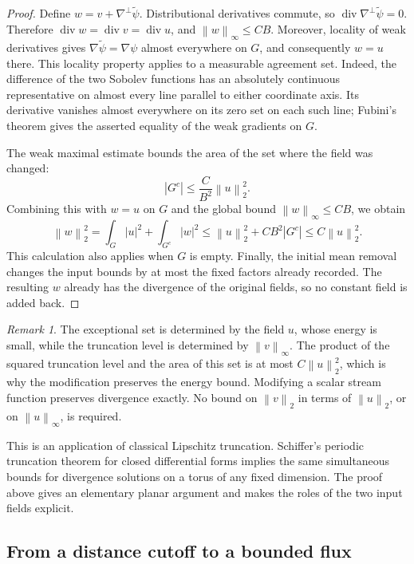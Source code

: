 \documentclass[11pt]{article}
\newcommand{\diver}{\operatorname{div}}
\newcommand{\norm}[1]{\left\lVert #1\right\rVert}
\theoremstyle{remark}
\newtheorem{remark}[theorem]{Remark}
\numberwithin{equation}{section}
\begin{document}
\begin{proof}
Define \(w=v+\nabla^\perp\widetilde\psi\). Distributional derivatives
commute, so \(\diver\nabla^\perp\widetilde\psi=0\). Therefore
\(\diver w=\diver v=\diver u\), and
\(\norm w_\infty\le CB\).
Moreover, locality of weak derivatives gives
\(\nabla\widetilde\psi=\nabla\psi\) almost everywhere on \(G\),
and consequently \(w=u\) there. This locality property applies to a
measurable agreement set. Indeed, the difference of the two Sobolev
functions has an absolutely continuous representative on almost every
line parallel to either coordinate axis. Its derivative vanishes almost
everywhere on its zero set on each such line; Fubini's theorem gives
the asserted equality of the weak gradients on \(G\).

The weak maximal estimate bounds the area of the set where the field
was changed:
\[
 |G^c|\le \frac{C}{B^2}\norm u_2^2.
\]
Combining this with \(w=u\) on \(G\) and the global bound
\(\norm w_\infty\le CB\), we obtain
\[
 \norm w_2^2
 =\int_G|u|^2+\int_{G^c}|w|^2
 \le\norm u_2^2+CB^2|G^c|
 \le C\norm u_2^2.
\]
This calculation also applies when \(G\) is empty. Finally, the
initial mean removal changes the input bounds by at most the fixed
factors already recorded. The resulting \(w\) already has the
divergence of the original fields, so no constant field is added back.
\end{proof}

\begin{remark}
The exceptional set is determined by the field \(u\), whose energy is
small, while the truncation level is determined by \(\norm v_\infty\).
The product of the squared truncation level and the area of this set is
at most \(C\norm u_2^2\), which is why the modification preserves the
energy bound. Modifying a scalar stream function preserves divergence
exactly. No bound on \(\norm v_2\) in terms of \(\norm u_2\), or on
\(\norm u_\infty\), is required.

This is an application of classical Lipschitz truncation.
Schiffer's periodic truncation theorem for closed differential forms
\cite[Theorem~5.1]{Sch22} implies the same simultaneous bounds for
divergence solutions on a torus of any fixed dimension. The proof
above gives an elementary planar argument and makes the roles of
the two input fields explicit.
\end{remark}

\subsection{From a distance cutoff to a bounded flux}
\label{sec:bounded-flux}
\end{document}

